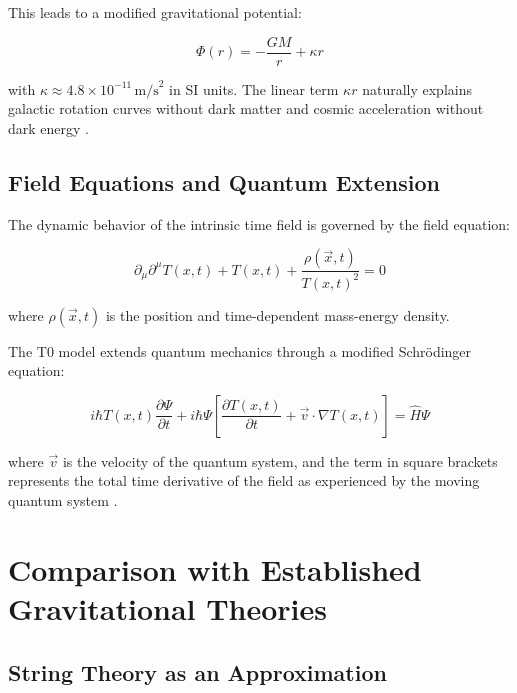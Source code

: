 \documentclass[12pt,a4paper]{article}
\newcommand{\Tfieldt}{T(x,t)}
\newcommand{\vecx}{\vec{x}}
\begin{document}
	This leads to a modified gravitational potential:
	
	\begin{equation}
		\Phi(r) = -\frac{GM}{r} + \kappa r
		\label{eq:modified_potential}
	\end{equation}
	
	with $\kappa \approx 4.8 \times 10^{-11} \, \text{m/s}^2$ in SI units. The linear term $\kappa r$ naturally explains galactic rotation curves without dark matter and cosmic acceleration without dark energy \cite{pascher_galaxies_2025}.
	
	\subsection{Field Equations and Quantum Extension}
	\label{subsec:field_equations}
	
	The dynamic behavior of the intrinsic time field is governed by the field equation:
	
	\begin{equation}
		\partial_{\mu}\partial^{\mu}\Tfieldt + \Tfieldt + \frac{\rho(\vecx,t)}{\Tfieldt^2} = 0
		\label{eq:field_equation}
	\end{equation}
	
	where $\rho(\vecx,t)$ is the position and time-dependent mass-energy density.
	
	The T0 model extends quantum mechanics through a modified Schrödinger equation:
	
	\begin{equation}
		i\hbar \Tfieldt \frac{\partial\Psi}{\partial t} + i\hbar \Psi \left[\frac{\partial \Tfieldt}{\partial t} + \vec{v}\cdot\nabla\Tfieldt\right] = \hat{H} \Psi
		\label{eq:modified_schrodinger}
	\end{equation}
	
	where $\vec{v}$ is the velocity of the quantum system, and the term in square brackets represents the total time derivative of the field as experienced by the moving quantum system \cite{pascher_quantum_2025}.
	
	\section{Comparison with Established Gravitational Theories}
	\label{sec:comparison}
	
	\subsection{String Theory as an Approximation}
	\label{subsec:string_theory}
	
\end{document}
